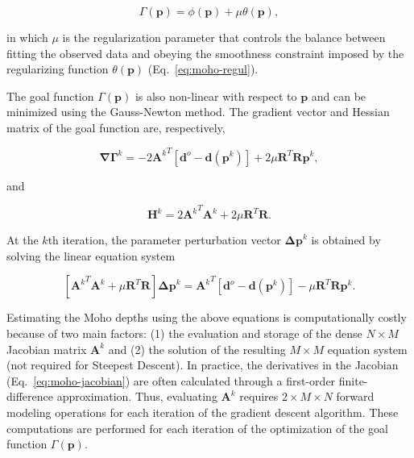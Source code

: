 \begin{equation}
    \Gamma(\mathbf{p}) = \phi(\mathbf{p}) + \mu\theta(\mathbf{p}),
    \label{eq:moho-goalfunction}
\end{equation}

\noindent
in which $\mu$ is the regularization parameter that controls the balance
between fitting the observed data and obeying the smoothness constraint imposed
by the regularizing function $\theta(\mathbf{p})$ (Eq.~\ref{eq:moho-regul}).

The goal function $\Gamma(\mathbf{p})$ is also non-linear with respect to
$\mathbf{p}$ and can be minimized using the Gauss-Newton method.
The gradient vector and Hessian matrix of the goal function are, respectively,

\begin{equation}
    \mathbf{\nabla\Gamma}^k =
        -2{\mathbf{A}^k}^T[\mathbf{d}^o - \mathbf{d}(\mathbf{p}^k)] +
        2\mu\mathbf{R}^T\mathbf{R}\mathbf{p}^k,
    \label{eq:moho-gradient-regul}
\end{equation}

\noindent and

\begin{equation}
    \mathbf{H}^k = 2{\mathbf{A}^k}^T{\mathbf{A}^k}
                   + 2\mu\mathbf{R}^T\mathbf{R}.
    \label{eq:moho-hessian-regul}
\end{equation}

At the $k$th iteration, the parameter perturbation vector
$\mathbf{\Delta p}^k$ is obtained by solving the linear equation system

\begin{equation}
    \left[{\mathbf{A}^k}^T{\mathbf{A}^k} + \mu\mathbf{R}^T\mathbf{R}\right]
    \mathbf{\Delta p}^k =
    {\mathbf{A}^k}^T[\mathbf{d}^o - \mathbf{d}(\mathbf{p}^k)] -
    \mu\mathbf{R}^T\mathbf{R}\mathbf{p}^k.
    \label{eq:moho-gaussnewton-regul}
\end{equation}

Estimating the Moho depths using the above equations is computationally
costly because of two main factors:
(1) the evaluation and storage of the dense $N \times M$ Jacobian matrix
${\mathbf{A}^k}$
and (2) the solution of the resulting $M \times M$ equation system
(not required for Steepest Descent).
In practice, the derivatives in the Jacobian (Eq.~\ref{eq:moho-jacobian})
are often calculated through a first-order finite-difference approximation.
Thus, evaluating ${\mathbf{A}^k}$ requires $2\times M \times N$ forward modeling
operations for each iteration of the gradient descent algorithm.
These computations are performed for each iteration of the optimization
of the goal function $\Gamma(\mathbf{p})$.


